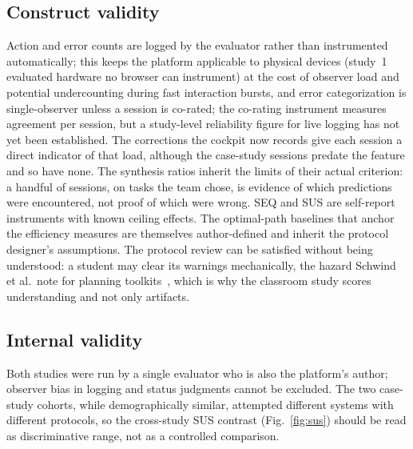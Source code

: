 \documentclass[conference]{IEEEtran}
\begin{document}
\subsection*{Construct validity}
Action and error counts are logged by the evaluator rather than
instrumented automatically; this keeps the platform applicable to physical
devices (study~1 evaluated hardware no browser can instrument) at the cost
of observer load and potential undercounting during fast interaction
bursts, and error categorization is single-observer unless a session
is co-rated; the co-rating instrument measures agreement per session,
but a study-level reliability figure for live logging has not yet been
established. The corrections the cockpit now records give each session a
direct indicator of that load, although the case-study sessions predate
the feature and so have none. The synthesis ratios inherit the
limits of their actual criterion: a handful of sessions, on tasks the team
chose, is evidence of which predictions were encountered, not proof of
which were wrong. SEQ and SUS are self-report instruments with
known ceiling effects. The optimal-path baselines that anchor the
efficiency measures are themselves author-defined and inherit the
protocol designer's assumptions. The protocol review can be satisfied
without being understood: a student may clear its warnings
mechanically, the hazard Schwind et al.\ note for planning
toolkits~\cite{schwind2023toolkit}, which is why the classroom study
scores understanding and not only artifacts.

\subsection*{Internal validity}
Both studies were run by a single evaluator who is also the platform's
author; observer bias in logging and status judgments cannot be excluded.
The two case-study cohorts, while demographically similar, attempted
different systems with different protocols, so the cross-study SUS
contrast (Fig.~\ref{fig:sus}) should be read as discriminative range, not
as a controlled comparison.
\end{document}
